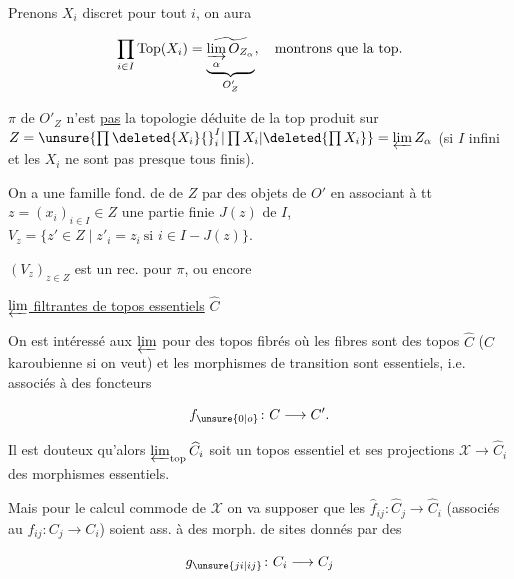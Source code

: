 Prenons $X_i$ discret pour tout $i$, on aura

\[
\prod_{i\in I}\mathrm{Top}(X_i)=\underbrace{\widetilde{\varinjlim_\alpha O_{Z_\alpha}}}_{O'_Z},\quad\text{montrons que la top.}
\]

$\pi$ de $O'_Z$ n'est \uline{pas} la topologie déduite de la top produit sur $Z=\unsure{\prod\deleted{X_i}{}^I_i|\prod X_i|\deleted{\prod X_i}}=\varprojlim Z_\alpha$ (si $I$ infini et les $X_i$ ne sont pas presque tous finis).

 On a une famille fond. de   de $Z$ par des objets de $O'$ en associant à tt $z=(x_i)_{i\in I}\in Z$ une partie finie $J(z)$ de $I$,     $V_z=\{z'\in Z\mid z'_i=z_i\ \text{si }i\in I-J(z)\}$.


 $(V_z)_{z\in Z}$ est  un rec. pour $\pi$, ou encore

\uline{$\varprojlim$ filtrantes de topos essentiels} $\widehat C$

On est intéressé aux $\varprojlim$ pour des topos fibrés où les fibres sont des topos $\widehat C$ ($C$ karoubienne  si on veut) et les morphismes de transition  sont essentiels, i.e. associés à des foncteurs

\[
f_{\unsure{0|o}}\colon C\longrightarrow C'.
\]

Il est douteux qu'alors  $\varprojlim_{\mathrm{top}}\widehat C_i$ soit un topos essentiel et ses projections $\mathscr X\longrightarrow\widehat C_i$ des morphismes essentiels.

Mais pour le calcul commode de $\mathscr X$ on va supposer que les $\widehat f_{ij}\colon\widehat C_j\longrightarrow\widehat C_i$  (associés au $f_{ij}\colon C_j\longrightarrow C_i$) soient ass. à des morph. de sites donnés par des 

\[
g_{\unsure{ji|ij}}\colon C_i\longrightarrow C_j
\]

